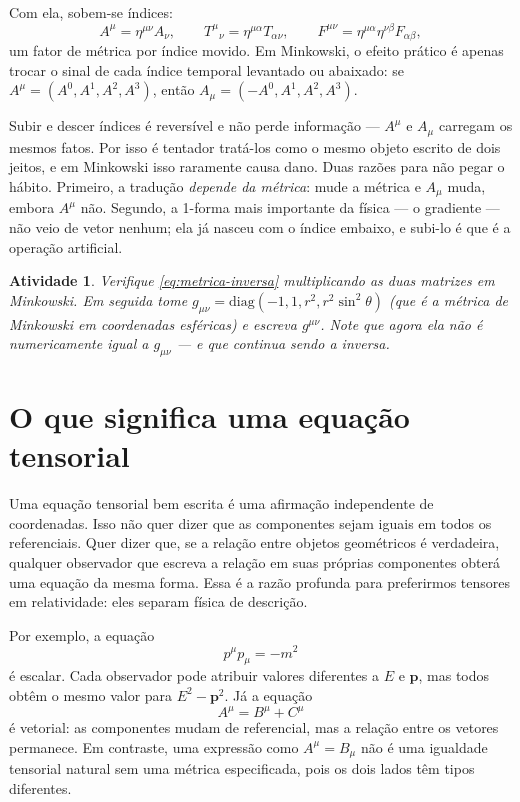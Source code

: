 \documentclass[12pt,a4paper,oneside]{book}
\theoremstyle{rgplain}
\newtheorem{activity}{Atividade}[chapter]
\theoremstyle{rgremark}
\begin{document}
Com ela, sobem-se índices:
\begin{equation}
  A^\mu=\eta^{\mu\nu}A_\nu ,
  \qquad
  T^{\mu}{}_{\nu}=\eta^{\mu\alpha}T_{\alpha\nu},
  \qquad
  F^{\mu\nu}=\eta^{\mu\alpha}\eta^{\nu\beta}F_{\alpha\beta},
  \label{eq:subir-indice}
\end{equation}
um fator de métrica por índice movido. Em Minkowski, o efeito prático é
apenas trocar o sinal de cada índice temporal levantado ou abaixado: se
$A^\mu=(A^0,A^1,A^2,A^3)$, então $A_\mu=(-A^0,A^1,A^2,A^3)$.

\begin{atencao}
Subir e descer índices é reversível e não perde informação --- $A^\mu$ e
$A_\mu$ carregam os mesmos fatos. Por isso é tentador tratá-los como o mesmo
objeto escrito de dois jeitos, e em Minkowski isso raramente causa dano. Duas
razões para não pegar o hábito. Primeiro, a tradução \emph{depende da
métrica}: mude a métrica e $A_\mu$ muda, embora $A^\mu$ não. Segundo, a
1-forma mais importante da física --- o gradiente --- não veio de vetor
nenhum; ela já nasceu com o índice embaixo, e subi-lo é que é a operação
artificial.
\end{atencao}

\begin{activity}
Verifique \eqref{eq:metrica-inversa} multiplicando as duas matrizes em
Minkowski. Em seguida tome $g_{\mu\nu}=\mathrm{diag}(-1,1,r^2,r^2\sin^2\theta)$
(que é a métrica de Minkowski em coordenadas esféricas) e escreva
$g^{\mu\nu}$. Note que agora ela \emph{não} é numericamente igual a
$g_{\mu\nu}$ --- e que continua sendo a inversa.
\end{activity}

\section{O que significa uma equação tensorial}
\label{sec:equacao-tensorial}

Uma equação tensorial bem escrita é uma afirmação independente de coordenadas.
Isso não quer dizer que as componentes sejam iguais em todos os referenciais.
Quer dizer que, se a relação entre objetos geométricos é verdadeira, qualquer
observador que escreva a relação em suas próprias componentes obterá uma
equação da mesma forma. Essa é a razão profunda para preferirmos tensores em
relatividade: eles separam física de descrição.

Por exemplo, a equação
\[
  p^\mu p_\mu=-m^2
\]
é escalar. Cada observador pode atribuir valores diferentes a $E$ e $\bm p$,
mas todos obtêm o mesmo valor para $E^2-\bm p^2$. Já a equação
\[
  A^\mu=B^\mu+C^\mu
\]
é vetorial: as componentes mudam de referencial, mas a relação entre os
vetores permanece. Em contraste, uma expressão como $A^\mu=B_\mu$ não é uma
igualdade tensorial natural sem uma métrica especificada, pois os dois lados
têm tipos diferentes.
\end{document}

